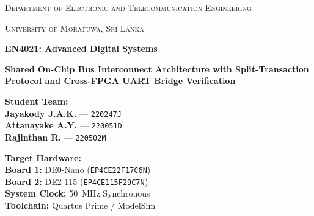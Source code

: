 \documentclass[11pt,a4paper]{article}
\begin{document}
\begin{titlepage}
    \centering
    \vspace*{0.5cm}
    {\scshape\LARGE Department of Electronic and Telecommunication Engineering \par}
    \vspace{0.3cm}
    {\scshape\Large University of Moratuwa, Sri Lanka \par}
    \vspace{1.2cm}
    
    \vspace{0.3cm}
    
    {\huge\bfseries\color{primaryblue} EN4021: Advanced Digital Systems \par}
    \vspace{0.3cm}
    {\Large\bfseries Shared On-Chip Bus Interconnect Architecture with Split-Transaction Protocol and Cross-FPGA UART Bridge Verification \par}
    \vspace{0.3cm}
    
    
    \vspace{1.5cm}

    \begin{minipage}[t]{0.50\textwidth}
        \flushleft
        \textbf{Student Team:}\\
        \vspace{0.2cm}
        \textbf{Jayakody J.A.K.} --- \texttt{220247J}\\
        \textbf{Attanayake A.Y.} --- \texttt{220051D}\\
        \textbf{Rajinthan R.} --- \texttt{220502M}
    \end{minipage}
    \hfill
    \begin{minipage}[t]{0.46\textwidth}
        \flushright
        \textbf{Target Hardware:}\\
        \vspace{0.2cm}
        \textbf{Board 1:} DE0-Nano (\texttt{EP4CE22F17C6N})\\
        \textbf{Board 2:} DE2-115 (\texttt{EP4CE115F29C7N})\\
        \textbf{System Clock:} 50~MHz Synchronous\\
        \textbf{Toolchain:} Quartus Prime / ModelSim
    \end{minipage}


\end{titlepage}
\end{document}
